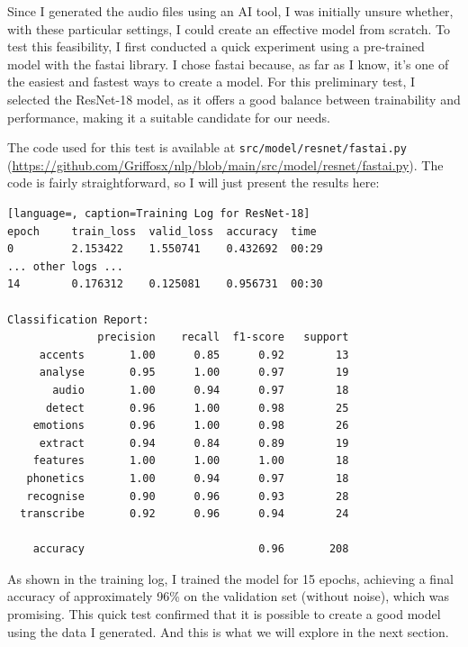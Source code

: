 \documentclass[12pt]{article}
\begin{document}
Since I generated the audio files using an AI tool, I was initially unsure whether, with these particular settings, I could create an effective model from scratch. To test this feasibility, I first conducted a quick experiment using a pre-trained model with the fastai library. I chose fastai because, as far as I know, it’s one of the easiest and fastest ways to create a model. For this preliminary test, I selected the ResNet-18 model, as it offers a good balance between trainability and performance, making it a suitable candidate for our needs.

The code used for this test is available at \texttt{src/model/resnet/fastai.py} 
\\ (\href{https://github.com/Griffosx/nlp/blob/main/src/model/resnet/fastai.py}{https://github.com/Griffosx/nlp/blob/main/src/model/resnet/fastai.py}). The code is fairly straightforward, so I will just present the results here:

\begin{lstlisting}[language=, caption=Training Log for ResNet-18]
epoch     train_loss  valid_loss  accuracy  time
0         2.153422    1.550741    0.432692  00:29
... other logs ...
14        0.176312    0.125081    0.956731  00:30

Classification Report:
              precision    recall  f1-score   support
     accents       1.00      0.85      0.92        13
     analyse       0.95      1.00      0.97        19
       audio       1.00      0.94      0.97        18
      detect       0.96      1.00      0.98        25
    emotions       0.96      1.00      0.98        26
     extract       0.94      0.84      0.89        19
    features       1.00      1.00      1.00        18
   phonetics       1.00      0.94      0.97        18
   recognise       0.90      0.96      0.93        28
  transcribe       0.92      0.96      0.94        24

    accuracy                           0.96       208
\end{lstlisting}

As shown in the training log, I trained the model for 15 epochs, achieving a final accuracy of approximately 96\% on the validation set (without noise), which was promising. This quick test confirmed that it is possible to create a good model using the data I generated. And this is what we will explore in the next section.
\end{document}
